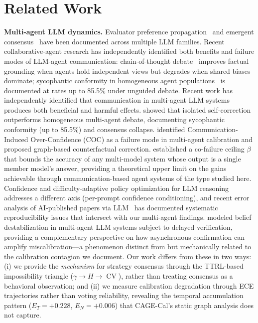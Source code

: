 \documentclass[11pt]{article}
\DeclareMathOperator{\CV}{CV}
\begin{document}
\section{Related Work}

\textbf{Multi-agent LLM dynamics.} Evaluator preference propagation~\cite{liu2026epc} and emergent consensus~\cite{park2023generative} have been documented across multiple LLM families. Recent collaborative-agent research has independently identified both benefits and failure modes of LLM-agent communication: chain-of-thought debate~\cite{du2024improving,li2023camel} improves factual grounding when agents hold independent views but degrades when shared biases dominate; sycophantic conformity in homogeneous agent populations~\cite{bertalanic2026cost} is documented at rates up to 85.5\% under unguided debate. Recent work has independently identified that communication in multi-agent LLM systems produces both beneficial and harmful effects. \citet{bertalanic2026cost} showed that isolated self-correction outperforms homogeneous multi-agent debate, documenting sycophantic conformity (up to 85.5\%) and consensus collapse. \citet{huang2026cagecal} identified Communication-Induced Over-Confidence (COC) as a failure mode in multi-agent calibration and proposed graph-based counterfactual correction. \citet{chen2026combining} established a co-failure ceiling $\beta$ that bounds the accuracy of any multi-model system whose output is a single member model's answer, providing a theoretical upper limit on the gains achievable through communication-based agent systems of the type studied here. Confidence and difficulty-adaptive policy optimization for LLM reasoning~\cite{tmlr260607950} addresses a different axis (per-prompt confidence conditioning), and recent error analysis of AI-published papers via LLM~\cite{tmlr251205925} has documented systematic reproducibility issues that intersect with our multi-agent findings. \citet{itkin2026delayed} modeled belief destabilization in multi-agent LLM systems subject to delayed verification, providing a complementary perspective on how asynchronous confirmation can amplify miscalibration---a phenomenon distinct from but mechanically related to the calibration contagion we document. Our work differs from these in two ways: (i) we provide the \textit{mechanism} for strategy consensus through the TTRL-based impossibility triangle ($\gamma \to H \to \CV$), rather than treating consensus as a behavioral observation; and (ii) we measure calibration degradation through ECE trajectories rather than voting reliability, revealing the temporal accumulation pattern ($E_T = +0.228$, $E_N = +0.006$) that CAGE-Cal's static graph analysis does not capture.
\end{document}
